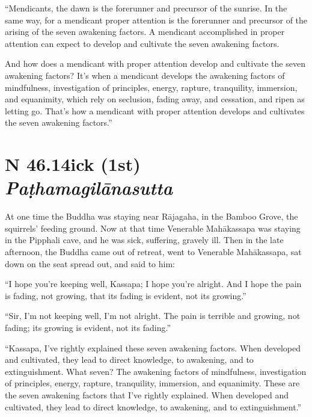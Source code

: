 \documentclass[12pt,openany]{book}%
\newcommand*{\suttatitleacronym}[1]{\smaller[2]{#1}\vspace*{.3em}}
\newcommand*{\suttatitletranslation}[1]{\linebreak{#1}}
\newcommand*{\suttatitleroot}[1]{\linebreak\smaller[2]\itshape{#1}}
\newcommand*{\tocacronym}[1]{\hspace*{-3.3em}{#1}\quad}
\newcommand*{\toctranslation}[1]{#1}
\newcommand*{\tocroot}[1]{(\textit{#1})}
\begin{document}
“Mendicants, the dawn is the forerunner and precursor of the sunrise. In the same way, for a mendicant proper attention is the forerunner and precursor of the arising of the seven awakening factors. A mendicant accomplished in proper attention can expect to develop and cultivate the seven awakening factors. 

And how does a mendicant with proper attention develop and cultivate the seven awakening factors? It’s when a mendicant develops the awakening factors of mindfulness, investigation of principles, energy, rapture, tranquility, immersion, and equanimity, which rely on seclusion, fading away, and cessation, and ripen as letting go. That’s how a mendicant with proper attention develops and cultivates the seven awakening factors.” 

%
\section*{{\suttatitleacronym SN 46.14}{\suttatitletranslation Sick (1st) }{\suttatitleroot Paṭhamagilānasutta}}
\addcontentsline{toc}{section}{\tocacronym{SN 46.14} \toctranslation{Sick (1st) } \tocroot{Paṭhamagilānasutta}}

At one time the Buddha was staying near \textsanskrit{Rājagaha}, in the Bamboo Grove, the squirrels’ feeding ground. Now at that time Venerable \textsanskrit{Mahākassapa} was staying in the Pipphali cave, and he was sick, suffering, gravely ill. Then in the late afternoon, the Buddha came out of retreat, went to Venerable \textsanskrit{Mahākassapa}, sat down on the seat spread out, and said to him: 

“I hope you’re keeping well, Kassapa; I hope you’re alright. And I hope the pain is fading, not growing, that its fading is evident, not its growing.” 

“Sir, I’m not keeping well, I’m not alright. The pain is terrible and growing, not fading; its growing is evident, not its fading.” 

“Kassapa, I’ve rightly explained these seven awakening factors. When developed and cultivated, they lead to direct knowledge, to awakening, and to extinguishment. What seven? The awakening factors of mindfulness, investigation of principles, energy, rapture, tranquility, immersion, and equanimity. These are the seven awakening factors that I’ve rightly explained. When developed and cultivated, they lead to direct knowledge, to awakening, and to extinguishment.” 
\end{document}
